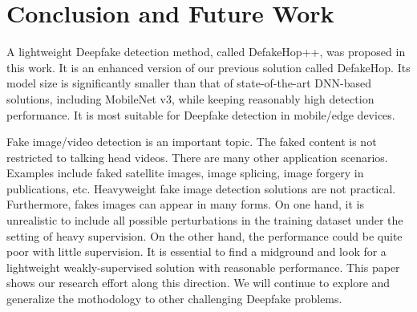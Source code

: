 \documentclass[main, biber]{now-journal}
\begin{document}
\section{Conclusion and Future Work}\label{sec:conclusion}

A lightweight Deepfake detection method, called DefakeHop++, was
proposed in this work. It is an enhanced version of our previous
solution called DefakeHop. Its model size is significantly smaller than
that of state-of-the-art DNN-based solutions, including MobileNet v3,
while keeping reasonably high detection performance.  It is most
suitable for Deepfake detection in mobile/edge devices. 

Fake image/video detection is an important topic. The faked content is
not restricted to talking head videos. There are many other application
scenarios. Examples include faked satellite images, image splicing,
image forgery in publications, etc. Heavyweight fake image detection
solutions are not practical. Furthermore, fakes images can appear in
many forms.  On one hand, it is unrealistic to include all possible
perturbations in the training dataset under the setting of heavy
supervision. On the other hand, the performance could be quite poor with
little supervision.  It is essential to find a midground and look for a
lightweight weakly-supervised solution with reasonable performance. This
paper shows our research effort along this direction. We will continue
to explore and generalize the mothodology to other challenging Deepfake
problems. 

\printbibliography
\end{document}
